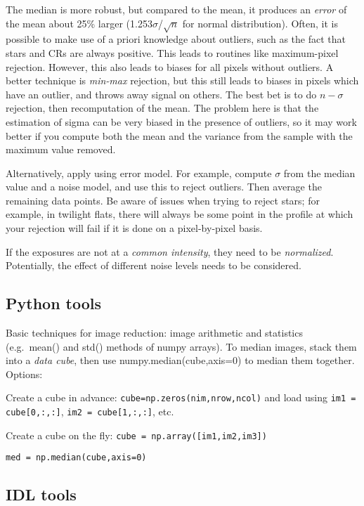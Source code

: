 \documentclass{article}
\begin{document}
The median is more robust, but compared to the mean, it produces
an \emph{error} of the mean about 25\% larger
(1.253$\sigma$/$\sqrt{n}$ for normal distribution).
Often, it is possible to make use of a priori
knowledge about outliers, such as the fact that stars and CRs are
always positive.
This leads to routines like maximum-pixel rejection. However, this also
leads to biases for all pixels without outliers.
A better technique is \emph{min-max} rejection, but this still leads to
biases in pixels which have an outlier, and throws away signal on others.
The best bet is to do $n-\sigma$ rejection, then recomputation
of the mean.
The problem here is that the estimation of sigma can be very
biased in the presence of outliers, so it may work better if you compute
both the mean and the variance from the sample with the maximum value
removed.

Alternatively, apply using error model.
For example, compute $\sigma$ from the median value and a noise model,
and use this to reject outliers. Then average the remaining data points.
Be aware of issues when trying to reject stars;
for example, in twilight flats, there will always be
some point in the profile at which your rejection will fail if it is done on
a pixel-by-pixel basis.

If the exposures are not at a \emph{common intensity}, they need to be
\emph{normalized}.
Potentially, the effect of different noise levels needs to be considered.

\subsection*{Python tools}

Basic techniques for image reduction: image arithmetic
and statistics (e.g.\ mean() and std() methods of numpy arrays).
To median images, stack them into a \emph{data cube}, then use
numpy.median(cube,axis=0) to median them together. Options:
\begin{itemize*}
    \item Create a cube in advance:
        \verb|cube=np.zeros(nim,nrow,ncol)| and load using
        \verb|im1 = cube[0,:,:]|,
        \verb|im2 = cube[1,:,:]|, etc.
    \item Create a cube on the fly:
        \verb|cube = np.array([im1,im2,im3])|
    \item \verb|med = np.median(cube,axis=0)|
\end{itemize*}

\subsection*{IDL tools}
\end{document}
